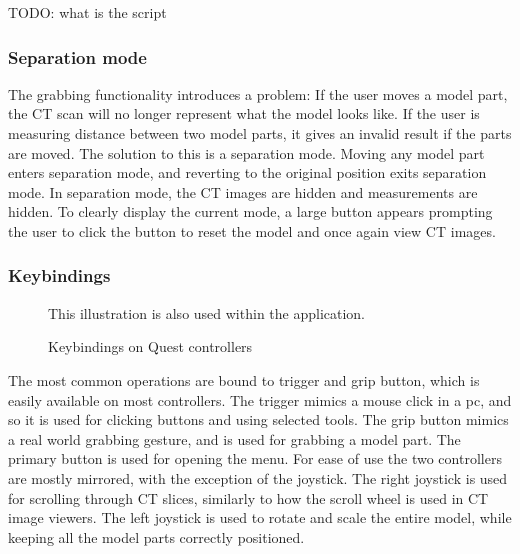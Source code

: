 \documentclass[a4paper]{report}
\begin{document}
TODO: what is the script

\subsubsection{Separation mode}
The grabbing functionality introduces a problem: If the user moves a model part, the CT scan will no longer represent what the model looks like. If the user is measuring distance between two model parts, it gives an invalid result if the parts are moved. 
The solution to this is a separation mode. Moving any model part enters separation mode, and reverting to the original position exits separation mode. In separation mode, the CT images are hidden and measurements are hidden. To clearly display the current mode, a large button appears prompting the user to click the button to reset the model and once again view CT images.


\subsubsection{Keybindings}

\begin{figure}[h!]
    \centering
	\hfill
  \caption{Keybindings on Quest controllers}
  \small
  This illustration is also used within the application.
\end{figure}

The most common operations are bound to trigger and grip button, which is easily available on most controllers. The trigger mimics a mouse click in a pc, and so it is used for clicking buttons and using selected tools. The grip button mimics a real world grabbing gesture, and is used for grabbing a model part.
The primary button is used for opening the menu.
For ease of use the two controllers are mostly mirrored, with the exception of the joystick. The right joystick is used for scrolling through CT slices, similarly to how the scroll wheel is used in CT image viewers. The left joystick is used to rotate and scale the entire model, while keeping all the model parts correctly positioned.
\end{document}

